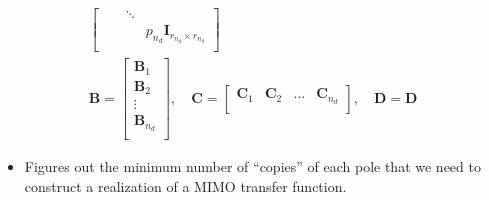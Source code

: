 \begin{enumerate}
\begin{gather*}
\begin{bmatrix}
                                                 &                                & \ddots &                                            \\
                                                 &                                &        & p_{n_d} \mathbf{I}_{r_{n_d}\times r_{n_d}} \\
              \end{bmatrix} \\
              \mathbf{B}  =\begin{bmatrix}
                  \mathbf{B}_1     \\
                  \mathbf{B}_2     \\
                  \vdots           \\
                  \mathbf{B}_{n_d} \\
              \end{bmatrix}, \quad
              \mathbf{C}  =\begin{bmatrix}
                  \mathbf{C}_1 & \mathbf{C}_2 & \dots & \mathbf{C}_{n_d} \\
              \end{bmatrix}, \quad
              \mathbf{D} = \mathbf{D}
          \end{gather*}
\end{enumerate}


\begin{itemize}
    \item Figures out the minimum number of ``copies'' of each pole that we need to construct a realization of a MIMO transfer function.
\end{itemize}

%     

